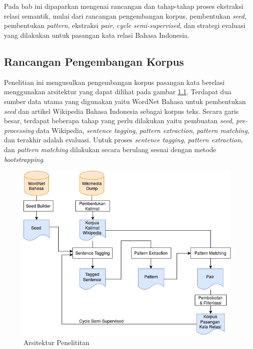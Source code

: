 \chapter{\babTiga}
Pada bab ini dipaparkan mengenai rancangan dan tahap-tahap proses ekstraksi relasi semantik, mulai dari rancangan pengembangan korpus, pembentukan \textit{seed}, pembentukan \textit{pattern}, ekstraksi \textit{pair}, \textit{cycle semi-supervised}, dan strategi evaluasi yang dilakukan untuk pasangan kata relasi Bahasa Indonesia. 


\section{Rancangan Pengembangan Korpus}
Penelitian ini mengusulkan pengembangan korpus pasangan kata berelasi menggunakan arsitektur yang dapat dilihat pada gambar \ref{fig:arsitektur-penelitian}. Terdapat dua sumber data utama yang digunakan yaitu WordNet Bahasa untuk pembentukan \textit{seed} dan artikel Wikipedia Bahasa Indonesia sebagai korpus teks. Secara garis besar, terdapat beberapa tahap yang perlu dilakukan yaitu pembuatan \textit{seed}, \textit{pre-processing} data Wikipedia, \textit{sentence tagging}, \textit{pattern extraction}, \textit{pattern matching}, dan terakhir adalah evaluasi. Untuk proses \textit{sentence tagging}, \textit{pattern extraction}, dan \textit{pattern matching} dilakukan secara berulang sesuai dengan metode \textit{bootstrapping}. 

\begin{figure}
    \centering
    \includegraphics[scale=0.55]{pics/Pic01-SemiSupervisedCycle}
    \caption{Arsitektur Penelititan}
    \label{fig:arsitektur-penelitian}
\end{figure}

